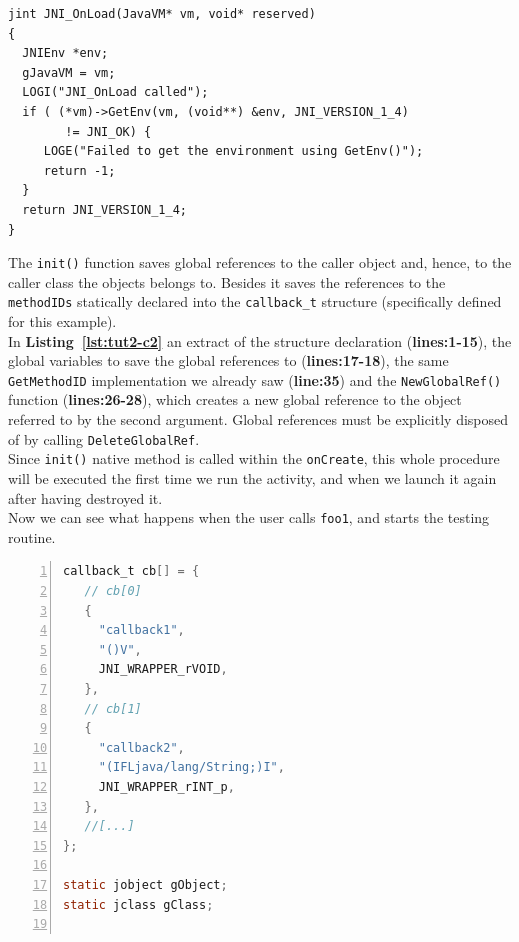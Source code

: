 \documentclass[a4paper,10pt]{article}
\newcommand{\keyword}[1]{\texttt{#1}}
\newcommand{\refl}[1]{\textbf{Listing~\ref{#1}}}
\begin{document}
\begin{multicols}{2}
\begin{lstlisting}
jint JNI_OnLoad(JavaVM* vm, void* reserved)
{
  JNIEnv *env;
  gJavaVM = vm;
  LOGI("JNI_OnLoad called");
  if ( (*vm)->GetEnv(vm, (void**) &env, JNI_VERSION_1_4)
  		!= JNI_OK) {
     LOGE("Failed to get the environment using GetEnv()");
     return -1;
  }
  return JNI_VERSION_1_4;
}
\end{lstlisting}
The \keyword{init()} function saves global references to the caller object and, hence, to the caller class the objects belongs to. Besides it saves the references to the \keyword{methodIDs} statically declared into the \keyword{callback\_t} structure (specifically defined for this example).\\
In \refl{lst:tut2-c2} an extract of the structure declaration (\textbf{lines:1-15}), the global variables to save the global references to (\textbf{lines:17-18}), the same \keyword{GetMethodID} implementation we already saw (\textbf{line:35}) and the \keyword{NewGlobalRef()} function (\textbf{lines:26-28}), which creates a new global reference to the object referred to by the second argument. Global references must be explicitly disposed of by calling \keyword{DeleteGlobalRef}.\\
Since \keyword{init()} native method is called within the \keyword{onCreate}, this whole procedure will be executed the first time we run the activity, and when we launch it again after having destroyed it.\\
Now we can see what happens when the user calls \keyword{foo1}, and starts the testing routine.
\begin{lstlisting}[language=C,
				   columns=fullflexible,
				   showstringspaces=false,
				   xleftmargin=15pt,
				   frame = l,
				   numbers=left,
				   commentstyle=\color{gray}\upshape,
				   caption=Part of tutorial2.c - init(),
				   label=lst:tut2-c2]
callback_t cb[] = {
   // cb[0]
   {
     "callback1",
     "()V",
     JNI_WRAPPER_rVOID,
   },
   // cb[1]
   {
     "callback2",
     "(IFLjava/lang/String;)I",
     JNI_WRAPPER_rINT_p,
   },
   //[...]
};

static jobject gObject;
static jclass gClass;


\end{lstlisting}
\end{multicols}
\end{document}
